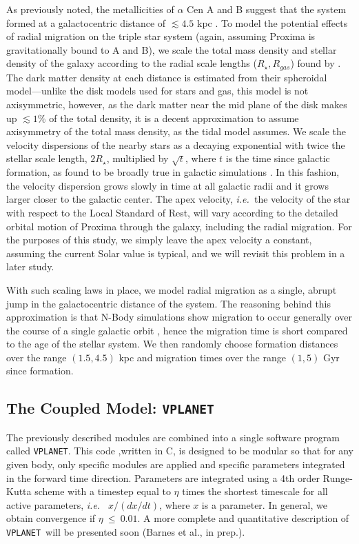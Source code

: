 \documentclass[preprint,12pt]{aastex}
\newcommand{\xxx}[1]{{\color{red} #1}} %
\def\ie{{\it i.e.\ }}
\def\vplanet{\texttt{\footnotesize{VPLANET}}\xspace}
\begin{document}
As previously noted, the metallicities of $\alpha$ Cen A and B 
suggest that the system formed at a galactocentric distance of 
$\lesssim 4.5$ kpc \citep{Loebman16}. To model the potential 
effects of radial migration on the triple star system (again, 
assuming Proxima is gravitationally bound to A and B), we 
scale the total mass density and stellar density of the galaxy 
according to the radial scale lengths ($R_{\star}, R_{gas}$) found
by \cite{Kordopatis15}. The dark matter density at each distance 
is estimated from their spheroidal model---unlike the disk models 
used for stars and gas, this model is not axisymmetric, however, 
as the dark matter near the mid plane of the disk makes up 
$\lesssim 1\%$ of the total density, it is a decent approximation 
to assume axisymmetry of the total mass density, as the 
\cite{Heisler1986} tidal model assumes. We scale the velocity 
dispersions of the nearby stars as a decaying exponential 
with twice the stellar scale length, $2R_{\star}$, multiplied by 
$\sqrt{t}$, where $t$ is the time since galactic formation, as found 
to be broadly true in galactic simulations 
\citep{Minchev2012, Roskar2012}. In this fashion, the velocity 
dispersion grows slowly in time at all galactic radii and it grows 
larger closer to the galactic center.
The apex velocity, \ie the velocity of the star with respect to
the Local Standard of Rest, will vary according to the detailed
orbital motion
of Proxima through the galaxy, including the radial migration.  For the
purposes of this study, we
simply leave the apex velocity a constant, assuming the current Solar
value is typical, and we will revisit this problem in a later study.

With such scaling laws in place, we model radial migration 
as a single, abrupt jump in the galactocentric distance of the 
system. The reasoning behind this approximation is that N-Body 
simulations show migration to occur generally over the 
course of a single galactic orbit \cite{Roskar2010}, hence the 
migration time is short compared to the age of the stellar system.
We then randomly choose formation distances over the range 
$(1.5,4.5)$ kpc and migration times over the range $(1,5)$ Gyr 
since formation.

\subsection{The Coupled Model: \vplanet}
\label{sec:models:vplanet}
The \xxx{previously described} modules are combined into a single software program
called \vplanet. This code\xxx{,written in C,} is designed to be
modular so that for any given body, only specific modules are applied
and specific parameters integrated in the forward time direction. 
Parameters are integrated
using a 4th order Runge-Kutta scheme with a timestep equal to $\eta$
times the shortest timescale for all active parameters, \ie
$x/(dx/dt)$, where $x$ is a parameter. In general, we obtain convergence if
$\eta~\le~0.01$. A more complete and quantitative description of
\vplanet~will be presented soon (Barnes et al., in prep.). 
\end{document}

